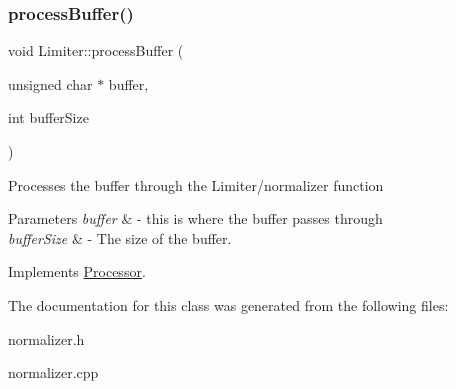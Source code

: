 \subsubsection{\texorpdfstring{process\+Buffer()}{processBuffer()}}
{\footnotesize\ttfamily void Limiter\+::process\+Buffer (\begin{DoxyParamCaption}\item[{unsigned char $\ast$}]{buffer,  }\item[{int}]{buffer\+Size }\end{DoxyParamCaption})\hspace{0.3cm}{\ttfamily [virtual]}}

Processes the buffer through the Limiter/normalizer function 
\begin{DoxyParams}{Parameters}
{\em buffer} & -\/ this is where the buffer passes through \\
\hline
{\em buffer\+Size} & -\/ The size of the buffer. \\
\hline
\end{DoxyParams}


Implements \hyperlink{classProcessor_a401e57b59e43de9c4a51ca0f566d2948}{Processor}.



The documentation for this class was generated from the following files\+:\begin{DoxyCompactItemize}
\item 
normalizer.\+h\item 
normalizer.\+cpp\end{DoxyCompactItemize}
